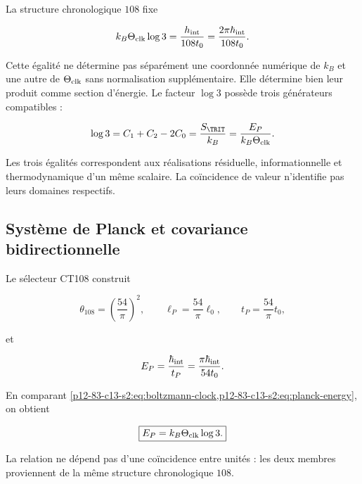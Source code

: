 La structure chronologique \(108\) fixe

\begin{equation}
k_B\Theta_{\rm clk}\log3
=\frac{h_{\rm int}}{108t_0}
=\frac{2\pi\hbar_{\rm int}}{108t_0}.
\label{p12-83-c13-s2:eq:boltzmann-clock}
\end{equation}

Cette égalité ne détermine pas séparément une coordonnée numérique de \(k_B\) et une autre de \(\Theta_{\rm clk}\) sans normalisation supplémentaire. Elle détermine bien leur produit comme section d'énergie. Le facteur \(\log3\) possède trois générateurs compatibles :

\begin{equation}
\log3=C_1+C_2-2C_0
=\frac{S_{\TRIT}}{k_B}
=\frac{E_P}{k_B\Theta_{\rm clk}}.
\label{p12-83-c13-s2:eq:log3-triple}
\end{equation}

Les trois égalités correspondent aux réalisations résiduelle, informationnelle et
thermodynamique d'un même scalaire. La coïncidence de valeur n'identifie pas
leurs domaines respectifs.

\subsection{Système de Planck et covariance bidirectionnelle}

Le sélecteur CT108 construit

\begin{equation}
\theta_{108}=\left(\frac{54}{\pi}\right)^2,
\qquad
\ell_P=\frac{54}{\pi}\ell_0,
\qquad
t_P=\frac{54}{\pi}t_0,
\label{p12-83-c13-s2:eq:planck-length-time}
\end{equation}

et

\begin{equation}
E_P=\frac{\hbar_{\rm int}}{t_P}
=\frac{\pi\hbar_{\rm int}}{54t_0}.
\label{p12-83-c13-s2:eq:planck-energy}
\end{equation}

En comparant \cref{p12-83-c13-s2:eq:boltzmann-clock,p12-83-c13-s2:eq:planck-energy}, on obtient

\begin{equation}
\boxed{E_P=k_B\Theta_{\rm clk}\log3.}
\label{p12-83-c13-s2:eq:planck-trit}
\end{equation}

La relation ne dépend pas d'une coïncidence entre unités : les deux membres
proviennent de la même structure chronologique \(108\).

